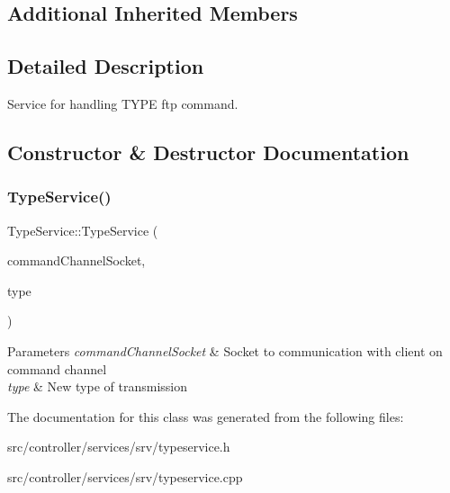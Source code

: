 \subsection*{Additional Inherited Members}


\subsection{Detailed Description}
Service for handling T\+Y\+PE ftp command. 

\subsection{Constructor \& Destructor Documentation}
\mbox{\label{classTypeService_ab5ad41eb754b7a2dd3889366bd0228fc}} 
\subsubsection{\texorpdfstring{Type\+Service()}{TypeService()}}
{\footnotesize\ttfamily Type\+Service\+::\+Type\+Service (\begin{DoxyParamCaption}\item[{int}]{command\+Channel\+Socket,  }\item[{Account\+Info\+::\+Transmission\+Type}]{type }\end{DoxyParamCaption})}


\begin{DoxyParams}{Parameters}
{\em command\+Channel\+Socket} & Socket to communication with client on command channel \\
\hline
{\em type} & New type of transmission \\
\hline
\end{DoxyParams}


The documentation for this class was generated from the following files\+:\begin{DoxyCompactItemize}
\item 
src/controller/services/srv/typeservice.\+h\item 
src/controller/services/srv/typeservice.\+cpp\end{DoxyCompactItemize}
